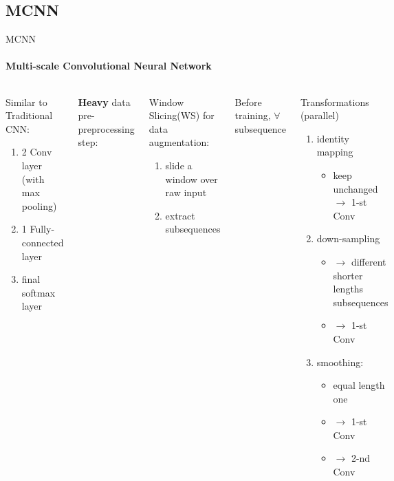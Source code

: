 \documentclass[aspectratio=169]{ctexbeamer}
\begin{document}
\subsection{MCNN}
\begin{frame}{MCNN}
	\framesubtitle{Multi-scale Convolutional Neural Network}
	\begin{columns}
		\begin{block}{Similar to Traditional CNN:}
			\begin{enumerate}
				\item 2 Conv layer (with max pooling)
				\item 1 Fully-connected layer
				\item final softmax layer
			\end{enumerate}
		\end{block}
		\textbf{Heavy} data pre-preprocessing step:
		\begin{block}{Window Slicing(WS)}
			for data augmentation:
			\begin{enumerate}
				\item slide a window over raw input
				\item extract subsequences
			\end{enumerate}
		\end{block}

		Before training, $\forall$ subsequence
		\begin{block}{Transformations (parallel)}
		\begin{enumerate}
			\item identity mapping
			\begin{itemize}
				\item keep unchanged $\to$ 1-st Conv
			\end{itemize}
			\item down-sampling
			\begin{itemize}
				\item $\to$ different shorter lengths subsequences
				\item $\to$ 1-st Conv
			\end{itemize}
			\item smoothing:
			\begin{itemize}
				\item equal length one
				\item $\to$ 1-st Conv
				\item $\to$ 2-nd Conv
			\end{itemize}
		\end{enumerate}
	\end{block}

	\end{columns}
\end{frame}
\end{document}
